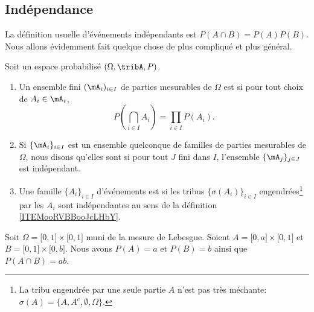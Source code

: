 \subsection{Indépendance}


La définition usuelle d'événements indépendants est \( P(A\cap B)=P(A)P(B)\). Nous allons évidemment fait quelque chose de plus compliqué et plus général.

\begin{definition}      \label{DEFooVYCUooKWvReO}
	Soit un espace probabilisé \( (\Omega,\tribA,P)\).
	\begin{enumerate}
		\item		\label{ITEMooMAJVooDOkohJ}
		      Un ensemble fini \( (\mA_i)_{i\in I}\) de parties mesurables de \( \Omega\) est  si pour tout choix de \( A_i\in\mA_i\),
		      \begin{equation}		\label{EQooERKOooPBRACZ}
			      P(\bigcap_{i\in I}A_i)=\prod_{i\in I}P(A_i).
		      \end{equation}
		\item		\label{ITEMooRVBBooJcLHbY}
		      Si \( \{ \mA_i \}_{i\in I}\) est un ensemble quelconque de familles de parties mesurables de \( \Omega\), nous disons qu'elles sont  si pour tout \( J\) fini dans \( I\), l'ensemble \( \{ \mA_j \}_{j\in J}\) est indépendant.
		\item		\label{ITEMooPCQXooGPKyeo}
		      Une famille \( \{ A_i \}_{i\in I}\) d'événements est  si les tribus \( \{ \sigma(A_i) \}_{i\in I}\) engendrées\footnote{La tribu engendrée par une seule partie \( A\) n'est pas très méchante: \( \sigma(A)=\{ A,A^c,\emptyset,\Omega \}\).} par les \( A_i\) sont indépendantes au sens de la définition \ref{ITEMooRVBBooJcLHbY}.
	\end{enumerate}
\end{definition}

\begin{example}
	Soit \( \Omega=\mathopen[ 0 , 1 \mathclose]\times \mathopen[ 0 , 1 \mathclose]\) muni de la mesure de Lebesgue. Soient \( A=\mathopen[ 0 , a \mathclose]\times \mathopen[ 0 , 1 \mathclose]\) et \( B=\mathopen[ 0 , 1 \mathclose]\times \mathopen[ 0 , b \mathclose]\). Nous avons \( P(A)=a\) et \( P(B)=b\) ainsi que \( P(A\cap B)=ab\).
\end{example}

